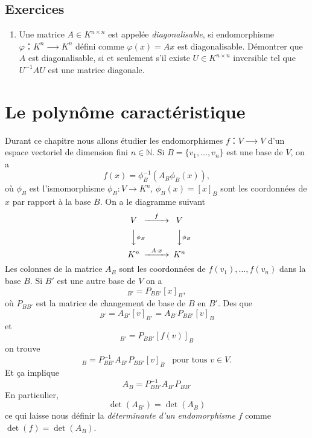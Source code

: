 \subsection*{Exercices}

\begin{enumerate}
\item Une matrice $A ∈ K^{n ×n}$ est appelée \emph{diagonalisable},  si endomorphisme $φ：K^n ⟶K^n$ défini comme $φ(x) = Ax$ est diagonalisable. Démontrer que $A$ est diagonalisable, si et seulement s'il existe $U ∈ K^{n×n}$ inversible tel que $U^{-1} A U$ est une matrice diagonale. \label{item:18}
\end{enumerate}

\section{Le polynôme caractéristique}
\label{sec:le-polyn-caract}

Durant ce chapitre nous allons étudier les endomorphismes $f：V⟶V$ d'un espace vectoriel de dimension fini $n ∈ ℕ$.  Si  $B = \{v_1,\dots,v_n\}$ est une base de $V$, on a
\begin{displaymath}
  f(x) = \phi_B^{-1} (A_B \phi_B(x)),
\end{displaymath}
où $\phi_B$ est l'ismomorphisme $\phi_B \colon V \longrightarrow K^n$, $\phi_B(x) = [x]_B$ sont les coordonnées de $x$ par rapport à la base $B$. On a le diagramme suivant
\begin{displaymath}
  {
  \begin{CD}
    V     @>f>>  V\\
    @VV \phi_B V        @VV \phi_B V\\
    K^n     @>A \cdot x>>  K^n
  \end{CD}}
\end{displaymath}
Les colonnes de la matrice $A_B$ sont les coordonnées de $f(v_1),\dots,f(v_n)$ dans la base $B$. Si $B'$ est une autre base de $V$ on a
\begin{displaymath}
  [x]_{B'} = P_{BB'}[x]_B,
\end{displaymath}
où $P_{BB'}$ est la matrice de changement de base de $B$ en $B'$. Des que
\begin{displaymath}
  [f(v)]_{B'} = A_{B'} [v]_{B'} = A_{B'} P_{BB'}[v]_B
\end{displaymath}
et
\begin{displaymath}
  [f(v)]_{B'} =  P_{BB'}[f(v)]_B 
\end{displaymath}
on trouve
\begin{displaymath}
  [f(v)]_B =  P_{BB'}^{-1}A_{B'} P_{BB'}[v]_B \,\,\,\text{ pour tous } v ∈V.
\end{displaymath}
Et ça implique 
\begin{equation}
  \label{eq:36}
  A_{B} =  P_{BB'}^{-1} A_{B'}  P_{BB'}
\end{equation}
En particulier,
\begin{displaymath}
  \det(A_{B'}) = \det(A_B) 
\end{displaymath}
ce qui laisse nous définir la \emph{déterminante d'un endomorphisme} $f$ comme $\det(f)= \det(A_B)$. 



